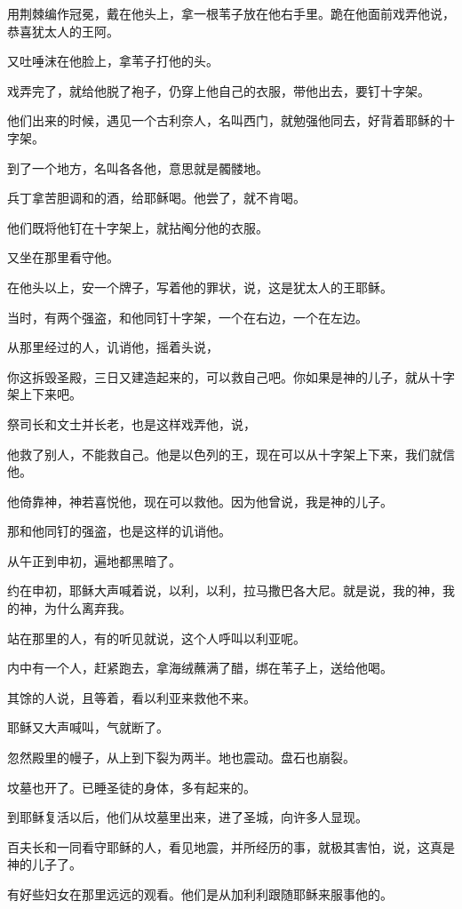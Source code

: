 \documentclass[12pt,oneside]{book}
\begin{document}
用荆棘编作冠冕，戴在他头上，拿一根苇子放在他右手里。跪在他面前戏弄他说，恭喜犹太人的王阿。

又吐唾沫在他脸上，拿苇子打他的头。

戏弄完了，就给他脱了袍子，仍穿上他自己的衣服，带他出去，要钉十字架。

他们出来的时候，遇见一个古利奈人，名叫西门，就勉强他同去，好背着耶稣的十字架。

到了一个地方，名叫各各他，意思就是髑髅地。

兵丁拿苦胆调和的酒，给耶稣喝。他尝了，就不肯喝。

他们既将他钉在十字架上，就拈阄分他的衣服。

又坐在那里看守他。

在他头以上，安一个牌子，写着他的罪状，说，这是犹太人的王耶稣。

当时，有两个强盗，和他同钉十字架，一个在右边，一个在左边。

从那里经过的人，讥诮他，摇着头说，

你这拆毁圣殿，三日又建造起来的，可以救自己吧。你如果是神的儿子，就从十字架上下来吧。

祭司长和文士并长老，也是这样戏弄他，说，

他救了别人，不能救自己。他是以色列的王，现在可以从十字架上下来，我们就信他。

他倚靠神，神若喜悦他，现在可以救他。因为他曾说，我是神的儿子。

那和他同钉的强盗，也是这样的讥诮他。

从午正到申初，遍地都黑暗了。

约在申初，耶稣大声喊着说，以利，以利，拉马撒巴各大尼。就是说，我的神，我的神，为什么离弃我。

站在那里的人，有的听见就说，这个人呼叫以利亚呢。

内中有一个人，赶紧跑去，拿海绒蘸满了醋，绑在苇子上，送给他喝。

其馀的人说，且等着，看以利亚来救他不来。

耶稣又大声喊叫，气就断了。

忽然殿里的幔子，从上到下裂为两半。地也震动。盘石也崩裂。

坟墓也开了。已睡圣徒的身体，多有起来的。

到耶稣复活以后，他们从坟墓里出来，进了圣城，向许多人显现。

百夫长和一同看守耶稣的人，看见地震，并所经历的事，就极其害怕，说，这真是神的儿子了。

有好些妇女在那里远远的观看。他们是从加利利跟随耶稣来服事他的。
\end{document}
